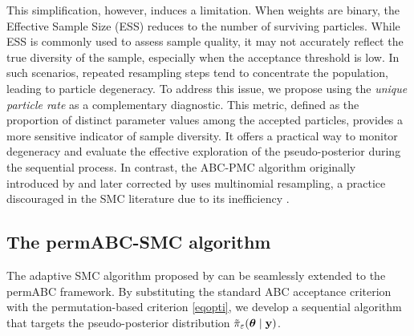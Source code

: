 {This simplification, however, induces a limitation. When weights are binary, the Effective Sample Size (ESS) reduces to the number of surviving particles. While ESS is commonly used to assess sample quality, it may not accurately reflect the true diversity of the sample, especially when the acceptance threshold is low. In such scenarios, repeated resampling steps tend to concentrate the population, leading to particle degeneracy.
To address this issue, we propose using the \emph{unique particle rate} as a complementary diagnostic. This metric, defined as the proportion of distinct parameter values among the accepted particles, provides a more sensitive indicator of sample diversity. It offers a practical way to monitor degeneracy and evaluate the effective exploration of the pseudo-posterior during the sequential process.
In contrast, the ABC-PMC algorithm originally introduced by \citet{sissonCorrectionSissonSequential2009} and later corrected by \citet{beaumontAdaptiveApproximateBayesian2009b} uses multinomial resampling, a practice discouraged in the SMC literature due to its inefficiency \citep{chopin2020introduction}.}


\subsection{The permABC-SMC algorithm}
\label{sec:permabc_smc}

The adaptive SMC algorithm proposed by \citet{delmoralAdaptiveSequentialMonte2012} can be seamlessly extended to the permABC framework. By substituting the standard ABC acceptance criterion with the permutation-based criterion \eqref{eqopti}, we develop a sequential algorithm that targets the pseudo-posterior distribution \( \tilde{\pi}_\varepsilon(\boldsymbol{\theta} \mid \mathbf{y}) \).

